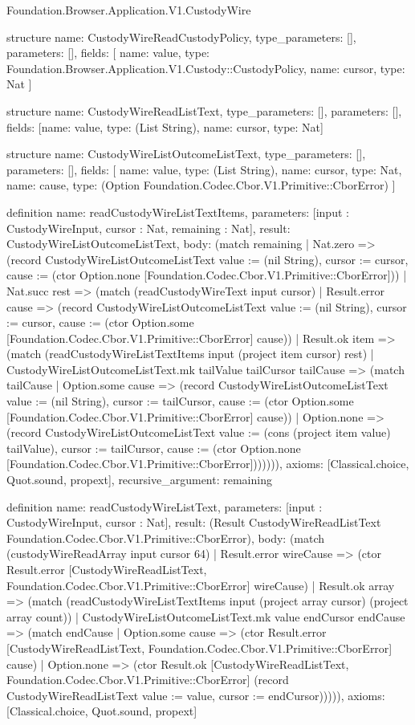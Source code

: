 \begin{lexlean}{Foundation.Browser.Application.V1.CustodyWire}
\begin{semanticmodule}
structure{
  name: CustodyWireReadCustodyPolicy,
  type_parameters: [],
  parameters: [],
  fields: [
    {name: value, type: Foundation.Browser.Application.V1.Custody::CustodyPolicy},
    {name: cursor, type: Nat}
  ]
}

structure{
  name: CustodyWireReadListText,
  type_parameters: [],
  parameters: [],
  fields: [{name: value, type: (List String)}, {name: cursor, type: Nat}]
}

structure{
  name: CustodyWireListOutcomeListText,
  type_parameters: [],
  parameters: [],
  fields: [
    {name: value, type: (List String)},
    {name: cursor, type: Nat},
    {name: cause, type: (Option Foundation.Codec.Cbor.V1.Primitive::CborError)}
  ]
}

definition{
  name: readCustodyWireListTextItems,
  parameters: [input : CustodyWireInput, cursor : Nat, remaining : Nat],
  result: CustodyWireListOutcomeListText,
  body: (match remaining
    | Nat.zero => (record CustodyWireListOutcomeListText {value := (nil String), cursor := cursor, cause := (ctor Option.none [Foundation.Codec.Cbor.V1.Primitive::CborError])})
    | Nat.succ rest => (match (readCustodyWireText input cursor)
      | Result.error cause => (record CustodyWireListOutcomeListText {value := (nil String), cursor := cursor, cause := (ctor Option.some [Foundation.Codec.Cbor.V1.Primitive::CborError] cause)})
      | Result.ok item => (match (readCustodyWireListTextItems input (project item cursor) rest)
        | CustodyWireListOutcomeListText.mk tailValue tailCursor tailCause => (match tailCause
          | Option.some cause => (record CustodyWireListOutcomeListText {value := (nil String), cursor := tailCursor, cause := (ctor Option.some [Foundation.Codec.Cbor.V1.Primitive::CborError] cause)})
          | Option.none => (record CustodyWireListOutcomeListText {value := (cons (project item value) tailValue), cursor := tailCursor, cause := (ctor Option.none [Foundation.Codec.Cbor.V1.Primitive::CborError])}))))),
  axioms: [Classical.choice, Quot.sound, propext],
  recursive_argument: remaining
}

definition{
  name: readCustodyWireListText,
  parameters: [input : CustodyWireInput, cursor : Nat],
  result: (Result CustodyWireReadListText Foundation.Codec.Cbor.V1.Primitive::CborError),
  body: (match (custodyWireReadArray input cursor 64)
    | Result.error wireCause => (ctor Result.error [CustodyWireReadListText, Foundation.Codec.Cbor.V1.Primitive::CborError] wireCause)
    | Result.ok array => (match (readCustodyWireListTextItems input (project array cursor) (project array count))
      | CustodyWireListOutcomeListText.mk value endCursor endCause => (match endCause
        | Option.some cause => (ctor Result.error [CustodyWireReadListText, Foundation.Codec.Cbor.V1.Primitive::CborError] cause)
        | Option.none => (ctor Result.ok [CustodyWireReadListText, Foundation.Codec.Cbor.V1.Primitive::CborError] (record CustodyWireReadListText {value := value, cursor := endCursor}))))),
  axioms: [Classical.choice, Quot.sound, propext]
}


\end{semanticmodule}
\end{lexlean}
